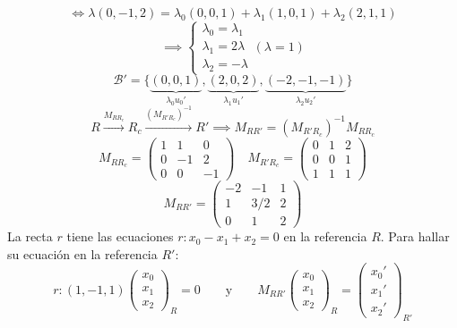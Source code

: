 {\[    \]
    \[
        \iff \lambda (0, -1, 2) = \lambda_0(0, 0, 1) + \lambda_1(1, 0, 1) + \lambda_2(2, 1, 1)
    \]
    \[
        \implies \begin{cases}
            \lambda_0 = \lambda_1 \\
            \lambda_1 = 2 \lambda \\
            \lambda_2 = -\lambda
        \end{cases} (\lambda = 1) 
    \]
    \[
        \mathcal{B}' = \{\underbrace{(0, 0, 1)}_{\lambda_0u_0'}, \underbrace{(2, 0, 2)}_{\lambda_1u_1'}, \underbrace{(-2, -1, -1)}_{\lambda_2u_2'}\}
    \]
    \[
        R \xrightarrow{M_{RR_c}} R_c \xrightarrow{(M_{R'R_c})^{-1}} R' \implies M_{RR'} = (M_{R'R_c})^{-1} M_{RR_c}
    \]
    \[
        M_{RR_c} = 
        \begin{pmatrix}
            1 & 1 & 0 \\
            0 & -1 & 2 \\
            0 & 0 & -1
        \end{pmatrix}
        \quad
        M_{R'R_c} = 
        \begin{pmatrix}
            0 & 1 & 2 \\
            0 & 0 & 1 \\
            1 & 1 & 1
        \end{pmatrix}
    \]
    \[
        M_{RR'} = \begin{pmatrix}
            -2 & -1 & 1 \\
            1 & 3/2 & 2 \\
            0 & 1 & 2
        \end{pmatrix}
    \]
    La recta $r$ tiene las ecuaciones $r : x_0 - x_1 + x_2 = 0$ en la referencia $R$. Para hallar su ecuación en la referencia $R'$:
    \[
        r : (1,-1,1) \begin{pmatrix}
            x_0 \\
            x_1 \\
            x_2
            \end{pmatrix}_R = 0 \qquad \text{y} \qquad M_{RR'} \begin{pmatrix}
            x_0 \\
            x_1 \\
            x_2
            \end{pmatrix}_R = \begin{pmatrix}
            x_0' \\
            x_1' \\
            x_2'
            \end{pmatrix}_{R'}           
\]}
